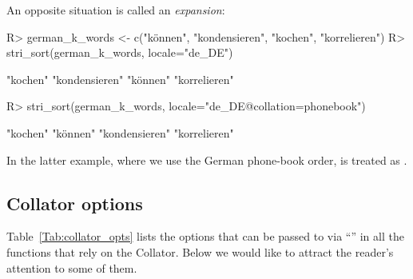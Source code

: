 \documentclass[nojss]{jss}\usepackage[]{graphicx}\usepackage[]{color}
\begin{document}
An opposite situation is called an \textit{expansion}:
\begin{Schunk}
\begin{Sinput}
R> german_k_words <- c("können", "kondensieren", "kochen", "korrelieren")
R> stri_sort(german_k_words, locale="de_DE")
\end{Sinput}
\begin{Soutput}
[1] "kochen"       "kondensieren" "können"       "korrelieren"
\end{Soutput}
\begin{Sinput}
R> stri_sort(german_k_words, locale="de_DE@collation=phonebook")
\end{Sinput}
\begin{Soutput}
[1] "kochen"       "können"       "kondensieren" "korrelieren"
\end{Soutput}
\end{Schunk}


In the latter example, where we use the German phone-book order,
 is treated as .



%
%
%
%
%



\subsection{Collator options}\label{Sec:collator_opts}

Table~\ref{Tab:collator_opts} lists the options
that can be passed to  via ``'' in
all the functions that rely on the  Collator.
Below we would like to attract the reader's attention
to some of them.
\end{document}
